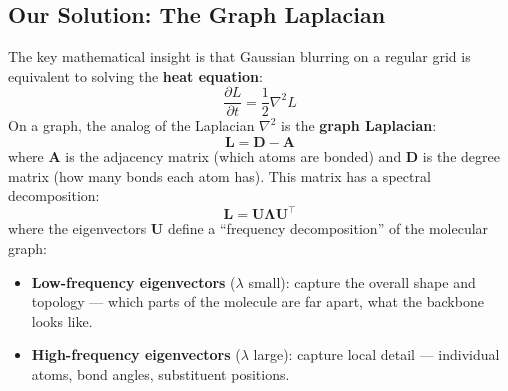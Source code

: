 \documentclass[12pt,a4paper]{article}
\begin{document}
\subsection{Our Solution: The Graph Laplacian}

The key mathematical insight is that Gaussian blurring on a regular grid is equivalent to solving the \textbf{heat equation}:
\[
\frac{\partial L}{\partial t} = \frac{1}{2} \nabla^2 L
\]
On a graph, the analog of the Laplacian $\nabla^2$ is the \textbf{graph Laplacian}:
\[
\bm{L} = \bm{D} - \bm{A}
\]
where $\bm{A}$ is the adjacency matrix (which atoms are bonded) and $\bm{D}$ is the degree matrix (how many bonds each atom has). This matrix has a spectral decomposition:
\[
\bm{L} = \bm{U} \bm{\Lambda} \bm{U}^\top
\]
where the eigenvectors $\bm{U}$ define a ``frequency decomposition'' of the molecular graph:
\begin{itemize}
  \item \textbf{Low-frequency eigenvectors} ($\lambda$ small): capture the overall shape and topology --- which parts of the molecule are far apart, what the backbone looks like.
  \item \textbf{High-frequency eigenvectors} ($\lambda$ large): capture local detail --- individual atoms, bond angles, substituent positions.
\end{itemize}

\end{document}
